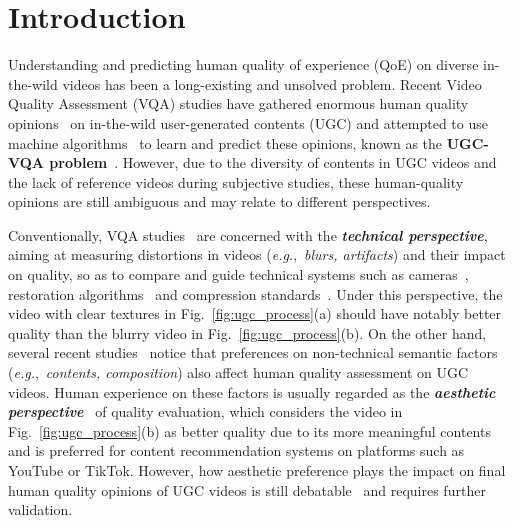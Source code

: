 \documentclass[10pt,twocolumn,letterpaper]{article}
\newcommand{\blue}[1]{\textbf{\textcolor{mblue}{#1}}}
\newcommand{\green}[1]{\textcolor{mgreen}{#1}}
\begin{document}
\section{Introduction}
\label{sec:intro}





Understanding and predicting human quality of experience (QoE) on diverse in-the-wild videos has been a long-existing and unsolved problem. Recent Video Quality Assessment (VQA) studies have gathered enormous human quality opinions~\cite{pvq,mlsp,kv1k,vqc,ytugccc} on in-the-wild user-generated contents (UGC) and attempted to use machine algorithms~\cite{vsfa,rfugc,internetvqa} to learn and predict these opinions, known as the \textbf{UGC-VQA problem}~\cite{videval}. However, due to the diversity of contents in UGC videos and the lack of reference videos during subjective studies, these human-quality opinions are still ambiguous and may relate to different perspectives.

\renewcommand{\thefootnote}{\fnsymbol{footnote}}


Conventionally, VQA studies~\cite{videval,tlvqm,niqe,tpqi,fastvqa} are concerned with the \textit{\textbf{\green{technical perspective}}}, aiming at measuring distortions in videos (\textit{e.g.},~\textit{blurs, artifacts}) and their impact on quality, so as to compare and guide technical systems such as cameras~\cite{dxomark,spaq}, restoration algorithms~\cite{basicvsr,swinir,mmp} and compression standards~\cite{h264}. Under this perspective, the video with clear textures in Fig.~\ref{fig:ugc_process}(a) should have notably better quality than the blurry video in Fig.~\ref{fig:ugc_process}(b). On the other hand, several recent studies~\cite{sfa,vsfa,rfugc,mlsp,discovqa} notice that preferences on non-technical semantic factors (\textit{e.g.},~\textit{contents, composition}) also affect human quality assessment on UGC videos. Human experience on these factors is usually regarded as the \textit{\textbf{\blue{aesthetic perspective}}}~\cite{avaiaa,mlspiaa,distilliaa,racniaa,piaadataset,objiaa} of quality evaluation, which considers the video in Fig.~\ref{fig:ugc_process}(b) as better quality due to its more meaningful contents and is preferred for content recommendation systems on platforms such as YouTube or TikTok. However, how aesthetic preference plays the impact on final human quality opinions of UGC videos is still debatable~\cite{pvq,mlsp} and requires further validation. 
\end{document}
